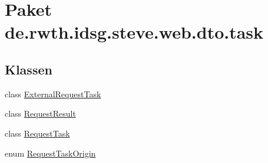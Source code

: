 \hypertarget{namespacede_1_1rwth_1_1idsg_1_1steve_1_1web_1_1dto_1_1task}{\section{Paket de.\-rwth.\-idsg.\-steve.\-web.\-dto.\-task}
\label{namespacede_1_1rwth_1_1idsg_1_1steve_1_1web_1_1dto_1_1task}
}
\subsection*{Klassen}
\begin{DoxyCompactItemize}
\item 
class \hyperlink{classde_1_1rwth_1_1idsg_1_1steve_1_1web_1_1dto_1_1task_1_1_external_request_task}{External\-Request\-Task}
\item 
class \hyperlink{classde_1_1rwth_1_1idsg_1_1steve_1_1web_1_1dto_1_1task_1_1_request_result}{Request\-Result}
\item 
class \hyperlink{classde_1_1rwth_1_1idsg_1_1steve_1_1web_1_1dto_1_1task_1_1_request_task}{Request\-Task}
\item 
enum \hyperlink{enumde_1_1rwth_1_1idsg_1_1steve_1_1web_1_1dto_1_1task_1_1_request_task_origin}{Request\-Task\-Origin}
\end{DoxyCompactItemize}
